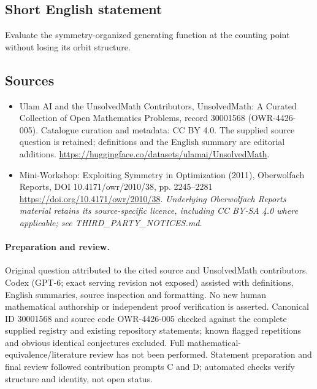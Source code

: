 \documentclass[11pt]{article}
\begin{document}
\subsection{Short English statement}
Evaluate the symmetry-organized generating function at the counting point without losing its orbit structure.
\subsection{Sources}
\begin{itemize}
\item[\hypertarget{source:30001568:1}{S1}] Ulam AI and the UnsolvedMath Contributors, UnsolvedMath: A Curated Collection of Open Mathematics Problems, record 30001568 (OWR-4426-005). Catalogue curation and metadata: CC BY 4.0. The supplied source question is retained; definitions and the English summary are editorial additions.
\url{https://huggingface.co/datasets/ulamai/UnsolvedMath}.
\item[\hypertarget{source:30001568:2}{S2}] Mini-Workshop: Exploiting Symmetry in Optimization (2011), Oberwolfach Reports, DOI 10.4171/owr/2010/38, pp. 2245--2281
\url{https://doi.org/10.4171/owr/2010/38}.
\textit{Underlying Oberwolfach Reports material retains its source-specific licence, including CC BY-SA 4.0 where applicable; see THIRD\_PARTY\_NOTICES.md.}
\end{itemize}
\paragraph{Preparation and review.}
Original question attributed to the cited source and UnsolvedMath contributors. Codex (GPT-6; exact serving revision not exposed) assisted with definitions, English summaries, source inspection and formatting. No new human mathematical authorship or independent proof verification is asserted. Canonical ID 30001568 and source code OWR-4426-005 checked against the complete supplied registry and existing repository statements; known flagged repetitions and obvious identical conjectures excluded. Full mathematical-equivalence/literature review has not been performed. Statement preparation and final review followed contribution prompts C and D; automated checks verify structure and identity, not open status.
\label{end:30001568}
\end{document}
